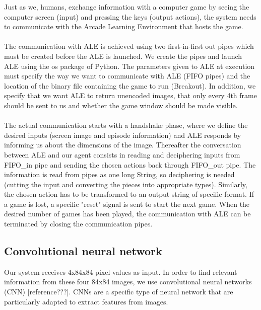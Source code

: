\documentclass[a4paper,12pt]{article}
\begin{document}
Just as we, humans, exchange information with a computer game by seeing the computer screen (input) and pressing the keys (output actions), the system needs to communicate with the Arcade Learning Environment that hosts the game.
\paragraph{}
The communication with ALE is achieved using two first-in-first out pipes which must be created before the ALE is launched. We create the pipes and launch ALE using the os package of Python. The parameters given to ALE at execution must specify the way we want to communicate with ALE (FIFO pipes) and the location of the binary file containing the game to run (Breakout). In addition, we specify that we want ALE to return unencoded images, that only every 4th frame should be sent to us and whether the game window should be made visible.


\paragraph{}
The actual communication starts with a handshake phase, where we define the desired inputs (screen image and episode information) and ALE responds by informing us about the dimensions of the image. Thereafter the conversation between ALE and our agent consists in reading and deciphering inputs from FIFO\_in pipe and sending the chosen actions back through FIFO\_out pipe. The information is read from pipes as one long String, so deciphering is needed (cutting the input and converting the pieces into appropriate types). Similarly, the chosen action has to be transformed to an output string of specific format. If a game is lost, a specific "reset" signal is sent to start the next game. When the desired number of games has been played, the communication with ALE can be terminated by closing the communication pipes. 



\subsection{Convolutional neural network}
Our system receives 4x84x84 pixel values as input. In order to find relevant information from these four 84x84 images, we use convolutional neural networks (CNN) [reference???]. CNNs are a specific type of neural network that are particularly adapted to extract features from images.
\end{document}
